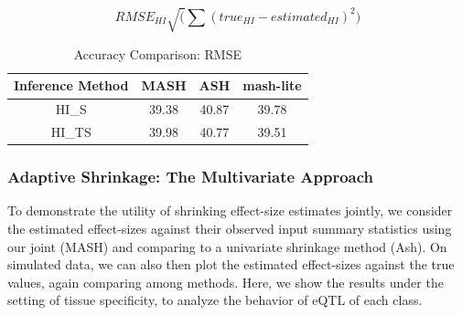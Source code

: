\begin{equation}
RMSE_{HI} \sqrt(\sum(true_{HI}-estimated_{HI})^2)
\end{equation}

\begin{table}[ht]
\caption{Accuracy Comparison: RMSE}
\centering
\begin{tabular}{c c c c}
\hline\hline
Inference Method & MASH & ASH & mash-lite \\ [0.5ex] %
\hline
HI_{S}&39.38 &40.87 &39.78 \\
HI_{TS}& 39.98& 40.77&39.51\\
\hline
\end{tabular}
\label{table:HETindex}
\end{table}

\subsubsection{Adaptive Shrinkage: The Multivariate Approach}

To demonstrate the utility of shrinking effect-size estimates jointly, we consider the estimated effect-sizes against their observed input summary statistics using our joint (MASH) and comparing to a univariate shrinkage method (Ash). On simulated data, we can also then plot the estimated effect-sizes against the true values, again comparing among methods. Here, we show the results under the setting of tissue specificity, to analyze the behavior of eQTL of each class.

